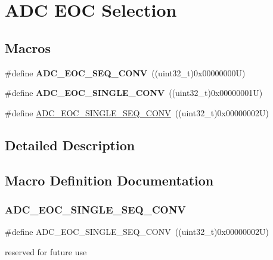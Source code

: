 \hypertarget{group___a_d_c___e_o_c_selection}{}\section{A\+DC E\+OC Selection}
\label{group___a_d_c___e_o_c_selection}
\subsection*{Macros}
\begin{DoxyCompactItemize}
\item 
\mbox{\label{group___a_d_c___e_o_c_selection_ga6c71ff64c9ecc9ba19ac088009f36cd8}} 
\#define {\bfseries A\+D\+C\+\_\+\+E\+O\+C\+\_\+\+S\+E\+Q\+\_\+\+C\+O\+NV}~((uint32\+\_\+t)0x00000000\+U)
\item 
\mbox{\label{group___a_d_c___e_o_c_selection_ga4c455483d74c1be899d4b2e8f45f202b}} 
\#define {\bfseries A\+D\+C\+\_\+\+E\+O\+C\+\_\+\+S\+I\+N\+G\+L\+E\+\_\+\+C\+O\+NV}~((uint32\+\_\+t)0x00000001\+U)
\item 
\#define \mbox{\hyperlink{group___a_d_c___e_o_c_selection_ga0cbb4e6ee76ee1bef233212bf947d320}{A\+D\+C\+\_\+\+E\+O\+C\+\_\+\+S\+I\+N\+G\+L\+E\+\_\+\+S\+E\+Q\+\_\+\+C\+O\+NV}}~((uint32\+\_\+t)0x00000002\+U)
\end{DoxyCompactItemize}


\subsection{Detailed Description}


\subsection{Macro Definition Documentation}
\mbox{\label{group___a_d_c___e_o_c_selection_ga0cbb4e6ee76ee1bef233212bf947d320}} 
\subsubsection{\texorpdfstring{ADC\_EOC\_SINGLE\_SEQ\_CONV}{ADC\_EOC\_SINGLE\_SEQ\_CONV}}
{\footnotesize\ttfamily \#define A\+D\+C\+\_\+\+E\+O\+C\+\_\+\+S\+I\+N\+G\+L\+E\+\_\+\+S\+E\+Q\+\_\+\+C\+O\+NV~((uint32\+\_\+t)0x00000002\+U)}

reserved for future use 